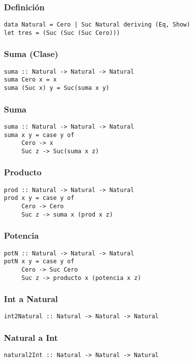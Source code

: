 \documentclass[11pt]{article}
\begin{document}
\subsubsection{Definición}
\label{sec-1-2-1}
\begin{verbatim}
data Natural = Cero | Suc Natural deriving (Eq, Show)
let tres = (Suc (Suc (Suc Cero)))
\end{verbatim}
\subsubsection{Suma (Clase)}
\label{sec-1-2-2}
\begin{verbatim}
suma :: Natural -> Natural -> Natural
suma Cero x = x
suma (Suc x) y = Suc(suma x y)
\end{verbatim}
\subsubsection{Suma}
\label{sec-1-2-3}
\begin{verbatim}
suma :: Natural -> Natural -> Natural
suma x y = case y of
     Cero -> x
     Suc z -> Suc(suma x z)
\end{verbatim}
\subsubsection{Producto}
\label{sec-1-2-4}
\begin{verbatim}
prod :: Natural -> Natural -> Natural
prod x y = case y of 
     Cero -> Cero
     Suc z -> suma x (prod x z)
\end{verbatim}
\subsubsection{Potencia}
\label{sec-1-2-5}
\begin{verbatim}
potN :: Natural -> Natural -> Natural
potN x y = case y of
     Cero -> Suc Cero
     Suc z -> producto x (potencia x z)
\end{verbatim}
\subsubsection{Int a Natural}
\label{sec-1-2-6}
\begin{verbatim}
int2Natural :: Natural -> Natural -> Natural
\end{verbatim}
\subsubsection{Natural a Int}
\label{sec-1-2-7}
\begin{verbatim}
natural2Int :: Natural -> Natural -> Natural
\end{verbatim}
\end{document}
